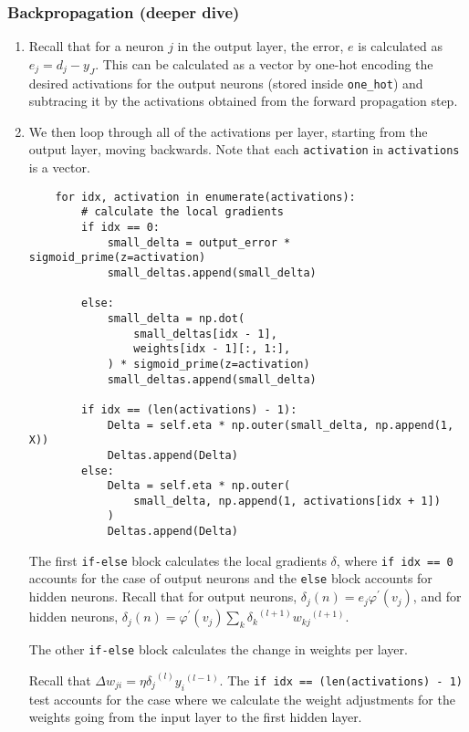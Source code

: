 \documentclass{article} %
\theoremstyle{definition}
\theoremstyle{remark}
\theoremstyle{plain}
\begin{document}
\subsubsection{Backpropagation (deeper dive)}
\begin{enumerate}
    \item Recall that for a neuron $j$ in the output layer, the error, $e$ is calculated as $e_j = d_j - y_J$. This can be calculated as a vector by one-hot encoding the desired activations for the output neurons (stored inside \verb|one_hot|) and subtracing it by the activations obtained from the forward propagation step.
    \item We then loop through all of the activations per layer, starting from the output layer, moving backwards. Note that each \verb|activation| in \verb|activations| is a vector.
    \begin{verbatim}
    for idx, activation in enumerate(activations):
        # calculate the local gradients
        if idx == 0:
            small_delta = output_error * sigmoid_prime(z=activation)
            small_deltas.append(small_delta)

        else:
            small_delta = np.dot(
                small_deltas[idx - 1],
                weights[idx - 1][:, 1:],
            ) * sigmoid_prime(z=activation)
            small_deltas.append(small_delta)

        if idx == (len(activations) - 1):
            Delta = self.eta * np.outer(small_delta, np.append(1, X))
            Deltas.append(Delta)
        else:
            Delta = self.eta * np.outer(
                small_delta, np.append(1, activations[idx + 1])
            )
            Deltas.append(Delta)
    \end{verbatim}

    The first \verb|if-else| block calculates the local gradients $\delta$, where \verb|if idx == 0| accounts for the case of output neurons and the \verb|else| block accounts for hidden neurons. Recall that for output neurons, $\delta_j(n)=e_j \varphi^{\prime}\left(v_j\right)$, and for hidden neurons, $\delta_j(n)= \varphi^{\prime} (v_j) \sum_k {\delta_k}^{(l+1)} {w_{kj}}^{(l+1)}$.

    The other \verb|if-else| block calculates the change in weights per layer.
    
    Recall that $\Delta {w}_{ji} = \eta {\delta_j}^{(l)} {y_i}^{(l-1)}$. The \verb|if idx == (len(activations) - 1)| test accounts for the case where we calculate the weight adjustments for the weights going from the input layer to the first hidden layer.
\end{enumerate}
\end{document}

